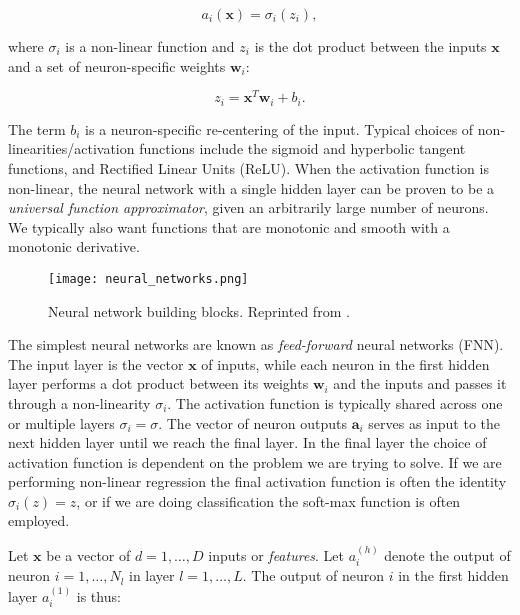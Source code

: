 \begin{equation}
 a_i(\bm{x}) = \sigma_i(z_i) ,
\end{equation}

where $\sigma_i$ is a non-linear function and $z_i$
is the dot product between the inputs $\bm{x}$ and a set of
neuron-specific weights $\bm{w}_i$:

\begin{equation}
 z_i = \bm{x}^T \bm{w}_i + b_i .
\end{equation}

The term $b_i$ is a neuron-specific re-centering of the input.
\newline
Typical choices of non-linearities/activation functions include
the sigmoid and hyperbolic tangent functions, and Rectified Linear Units (ReLU).
When the activation function is non-linear, the neural network with a single hidden
layer can be proven to be a \textit{universal function approximator},
given an arbitrarily large number of neurons. We typically also
want functions that are monotonic and smooth with a monotonic derivative.
\newline

\begin{figure}[h]
    \centering
    \texttt{[image: neural\_networks.png]}
    \caption{Neural network building blocks. Reprinted from
    \parencite[Vieira, Pinaya, Mechelli]{vieira2017using}.}
    \label{fig:neural-networks}
\end{figure}

The simplest neural networks are known as \textit{feed-forward} neural networks (FNN).
The input layer is the vector $\bm{x}$ of inputs, while each neuron in the first
hidden layer performs a dot product between its weights $\bm{w}_i$ and the inputs
and passes it through a non-linearity $\sigma_i$. The activation function
is typically shared across one or multiple layers $\sigma_i = \sigma$. The vector of neuron outputs
$\bm{a}_i$ serves as input to the next hidden layer until we reach the final layer.
In the final layer the choice of activation function is dependent on the problem
we are trying to solve. If we are performing non-linear regression the
final activation function is often the identity $\sigma_i(z) = z$, or if
we are doing classification the soft-max function is often employed.

\newpage

Let $\bm{x}$ be a vector of $d = 1,\dots,D$ inputs or 
\textit{features}. Let $a_i^{(h)}$
denote the output of neuron $i = 1,\dots,N_l$ in layer $l = 1,\dots,L$.
The output of neuron $i$ in the first hidden layer $a_i^{(1)}$ is thus:


